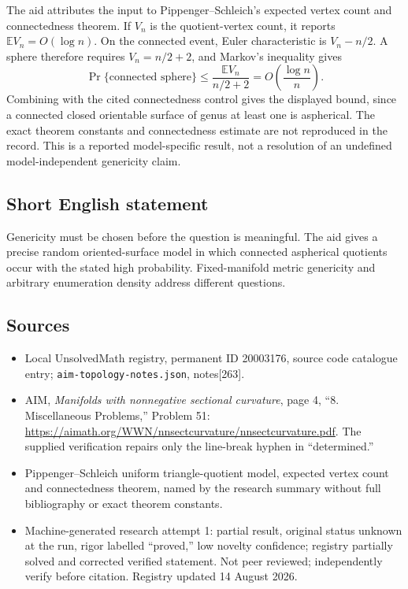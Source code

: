 \documentclass[11pt]{article}
\newcommand{\E}{\mathbb{E}}
\begin{document}
The aid attributes the input to Pippenger--Schleich's expected vertex count and connectedness theorem. If $V_n$ is the quotient-vertex count, it reports $\E V_n=O(\log n)$. On the connected event, Euler characteristic is $V_n-n/2$. A sphere therefore requires $V_n=n/2+2$, and Markov's inequality gives
\[
 \Pr\{\text{connected sphere}\}
 \leq\frac{\E V_n}{n/2+2}
 =O\!\left(\frac{\log n}{n}\right).
\]
Combining with the cited connectedness control gives the displayed bound, since a connected closed orientable surface of genus at least one is aspherical. The exact theorem constants and connectedness estimate are not reproduced in the record. This is a reported model-specific result, not a resolution of an undefined model-independent genericity claim.
\subsection{Short English statement}
Genericity must be chosen before the question is meaningful. The aid gives a precise random oriented-surface model in which connected aspherical quotients occur with the stated high probability. Fixed-manifold metric genericity and arbitrary enumeration density address different questions.
\subsection{Sources}
\begin{itemize}
\item Local UnsolvedMath registry, permanent ID 20003176, source code catalogue entry; \texttt{aim-topology-notes.json}, notes[263].
\item AIM, \emph{Manifolds with nonnegative sectional curvature}, page 4, ``8. Miscellaneous Problems,'' Problem 51: \url{https://aimath.org/WWN/nnsectcurvature/nnsectcurvature.pdf}. The supplied verification repairs only the line-break hyphen in ``determined.''
\item Pippenger--Schleich uniform triangle-quotient model, expected vertex count and connectedness theorem, named by the research summary without full bibliography or exact theorem constants.
\item Machine-generated research attempt 1: partial result, original status unknown at the run, rigor labelled ``proved,'' low novelty confidence; registry partially solved and corrected verified statement. Not peer reviewed; independently verify before citation. Registry updated 14 August 2026.
\end{itemize}
\end{document}
